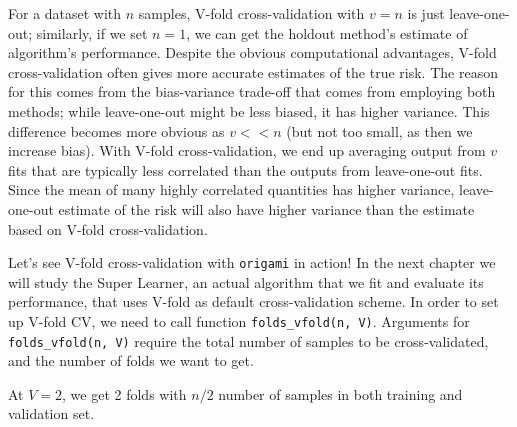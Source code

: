 \documentclass[12pt, krantz2,]{book}
\newenvironment{Shaded}{\begin{snugshade}}{\end{snugshade}}
\newcommand{\CommentTok}[1]{\textcolor[rgb]{0.56,0.35,0.01}{\textit{#1}}}
\newcommand{\DataTypeTok}[1]{\textcolor[rgb]{0.13,0.29,0.53}{#1}}
\newcommand{\DecValTok}[1]{\textcolor[rgb]{0.00,0.00,0.81}{#1}}
\newcommand{\KeywordTok}[1]{\textcolor[rgb]{0.13,0.29,0.53}{\textbf{#1}}}
\newcommand{\NormalTok}[1]{#1}
\newcommand{\StringTok}[1]{\textcolor[rgb]{0.31,0.60,0.02}{#1}}
\theoremstyle{definition}
\theoremstyle{definition}
\theoremstyle{definition}
\newcommand{\1}{\mathbbm{1}}
\begin{document}
For a dataset with \(n\) samples, V-fold cross-validation with \(v=n\) is just
leave-one-out; similarly, if we set \(n=1\), we can get the holdout method's
estimate of algorithm's performance. Despite the obvious computational
advantages, V-fold cross-validation often gives more accurate estimates of the
true risk. The reason for this comes from the bias-variance trade-off that comes
from employing both methods; while leave-one-out might be less biased, it has
higher variance. This difference becomes more obvious as \(v<<n\) (but not too
small, as then we increase bias). With V-fold cross-validation, we end up
averaging output from \(v\) fits that are typically less correlated than the
outputs from leave-one-out fits. Since the mean of many highly correlated
quantities has higher variance, leave-one-out estimate of the risk will also
have higher variance than the estimate based on V-fold cross-validation.

Let's see V-fold cross-validation with \texttt{origami} in action! In the next chapter
we will study the Super Learner, an actual algorithm that we fit and evaluate
its performance, that uses V-fold as default cross-validation scheme. In order
to set up V-fold CV, we need to call function \texttt{folds\_vfold(n,\ V)}. Arguments
for \texttt{folds\_vfold(n,\ V)} require the total number of samples to be
cross-validated, and the number of folds we want to get.

At \(V=2\), we get 2 folds with \(n/2\) number of samples in both training and
validation set.

\begin{Shaded}
\end{Shaded}
\end{document}
